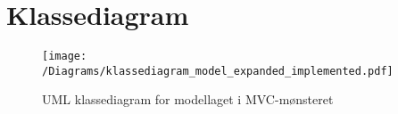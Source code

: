 \chapter{Klassediagram}
\begin{figure}[h]
\texttt{[image: /Diagrams/klassediagram\_model\_expanded\_implemented.pdf]}
\caption{UML klassediagram for modellaget i MVC-mønsteret}
\end{figure}

